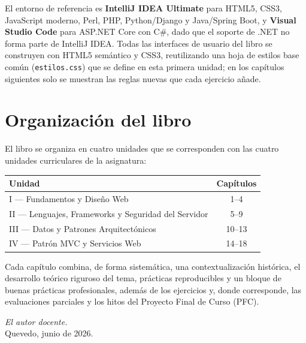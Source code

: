 \documentclass[11pt,a4paper,openany]{book}
\begin{document}
El entorno de referencia es \textbf{IntelliJ IDEA Ultimate} para HTML5, CSS3,
JavaScript moderno, Perl, PHP, Python/Django y Java/Spring Boot, y
\textbf{Visual Studio Code} para ASP.NET Core con C\#, dado que el soporte de
.NET no forma parte de IntelliJ IDEA. Todas las interfaces de usuario del
libro se construyen con HTML5 semántico y CSS3, reutilizando una hoja de
estilos base común (\texttt{estilos.css}) que se define en esta primera
unidad; en los capítulos siguientes solo se muestran las reglas nuevas que
cada ejercicio añade.

\section*{Organización del libro}

El libro se organiza en cuatro unidades que se corresponden con las cuatro
unidades curriculares de la asignatura:

\begin{center}
\renewcommand{\arraystretch}{1.3}
\begin{tabular}{>{\raggedright\arraybackslash}p{7.2cm}c}
\toprule
\textbf{Unidad} & \textbf{Capítulos} \\
\midrule
I --- Fundamentos y Diseño Web & 1--4 \\
II --- Lenguajes, Frameworks y Seguridad del Servidor & 5--9 \\
III --- Datos y Patrones Arquitectónicos & 10--13 \\
IV --- Patrón MVC y Servicios Web & 14--18 \\
\bottomrule
\end{tabular}
\end{center}

Cada capítulo combina, de forma sistemática, una contextualización
histórica, el desarrollo teórico riguroso del tema, prácticas reproducibles
y un bloque de buenas prácticas profesionales, además de los ejercicios y,
donde corresponde, las evaluaciones parciales y los hitos del Proyecto Final
de Curso (PFC).

\hfill\textit{El autor docente.}\\
\hfill Quevedo, junio de 2026.

\tableofcontents
\listoffigures
\listoftables
\lstlistoflistings

\mainmatter


\end{document}
